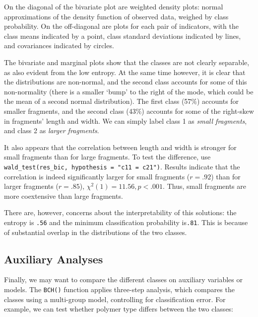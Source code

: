 \documentclass[
  man,floatsintext]{apa6}
\newenvironment{Shaded}{\begin{snugshade}}{\end{snugshade}}
\newcommand{\AttributeTok}[1]{\textcolor[rgb]{0.77,0.63,0.00}{#1}}
\newcommand{\FunctionTok}[1]{\textcolor[rgb]{0.00,0.00,0.00}{#1}}
\newcommand{\NormalTok}[1]{#1}
\newcommand{\OtherTok}[1]{\textcolor[rgb]{0.56,0.35,0.01}{#1}}
\newcommand{\SpecialCharTok}[1]{\textcolor[rgb]{0.00,0.00,0.00}{#1}}
\newcommand{\StringTok}[1]{\textcolor[rgb]{0.31,0.60,0.02}{#1}}
\begin{document}
On the diagonal of the bivariate plot are weighted density plots:
normal approximations of the density function of observed data,
weighed by class probability.
On the off-diagonal are plots for each pair of indicators,
with the class means indicated by a point,
class standard deviations indicated by lines,
and covariances indicated by circles.

The bivariate and marginal plots show that the classes are not clearly separable, as also evident from the low entropy.
At the same time however, it is clear that the distributions are non-normal, and the second class accounts for some of this non-normality (there is a smaller `bump' to the right of the mode, which could be the mean of a second normal distribution).
The first class (57\%) accounts for smaller fragments, and the second class (43\%) accounts for some of the right-skew in fragments' length and width.
We can simply label class 1 as \emph{small fragments},
and class 2 as \emph{larger fragments}.

It also appears that the correlation between length and width is stronger for small fragments than for large fragments.
To test the difference, use \texttt{wald\_test(res\_bic,\ hypothesis\ =\ "c11\ =\ c21")}.
Results indicate that the correlation is indeed significantly larger for small fragments (\(r = .92\)) than for larger fragments (\(r = .85\)), \(\chi^2(1) = 11.56, p < .001\).
Thus, small fragments are more coextensive than large fragments.

There are, however,
concerns about the interpretability of this solutions:
the entropy is \texttt{.56} and the minimum classification probability is\texttt{.81}.
This is because of substantial overlap in the distributions of the two classes.

\hypertarget{auxiliary-analyses}{%
\subsection{Auxiliary Analyses}\label{auxiliary-analyses}}

Finally, we may want to compare the different classes on auxiliary variables or models.
The \texttt{BCH()} function applies three-step analysis,
which compares the classes using a multi-group model,
controlling for classification error.
For example, we can test whether polymer type differs between the two classes:

\begin{Shaded}
\end{Shaded}
\end{document}
